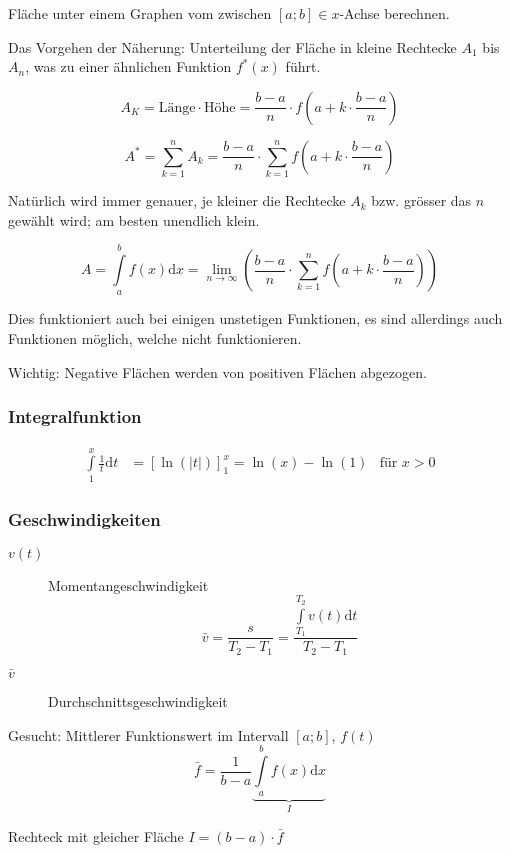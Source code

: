 Fläche unter einem Graphen vom zwischen $[a;b] \in x$-Achse berechnen.

Das Vorgehen der Näherung: Unterteilung der Fläche in kleine Rechtecke $A_1$ bis $A_n$, was zu einer ähnlichen Funktion $f^\ast(x)$ führt.


\[
A_K = \text{Länge} \cdot \text{Höhe} = \frac{b-a}{n} \cdot f\left(a + k \cdot \frac{b-a}{n}\right)
\]

\[
A^\ast = \sum^n_{k=1}{A_k} = \frac{b-a}{n} \cdot \sum^n_{k=1}{ f\left(a + k \cdot \frac{b-a}{n}\right)}
\]

Natürlich wird immer genauer, je kleiner die Rechtecke $A_k$ bzw. grösser das $n$ gewählt wird; am besten unendlich klein.

\[
A = \int\limits^b_a{f(x) \mathrm{d}x} = \lim_{n \to \infty} \left( \frac{b-a}{n} \cdot \sum^n_{k=1}{ f\left(a + k \cdot \frac{b-a}{n}\right)} \right)
\]

Dies funktioniert auch bei einigen unstetigen Funktionen, es sind allerdings auch Funktionen möglich, welche nicht funktionieren.

Wichtig: Negative Flächen werden von positiven Flächen abgezogen.

\subsubsection{Integralfunktion}

\begin{align*}
	\int\limits^{x}_{1} \frac{1}{t} \mathrm{d}t &= \left[ \ln(|t|) \right]^x_1 = \ln(x) - \ln(1) & \text{für } x > 0
\end{align*}

\subsubsection{Geschwindigkeiten}

\begin{description}
	\item[$v(t)$] Momentangeschwindigkeit 
	\[
		\bar{v} = \frac{s}{T_2- T_1} = \frac{\int\limits^{T_2}_{T_1}{v(t)\mathrm{d}t}}{T_2 - T_1}
	\]
	\item[$\bar{v}$] Durchschnittsgeschwindigkeit
\end{description}

Gesucht: Mittlerer Funktionswert im Intervall $[a;b]$, $f(t)$
\[
	\bar{f} = \frac{1}{b-a} \underbrace{\int\limits^b_a{f(x)\mathrm{d}x}}_I
\]

Rechteck mit gleicher Fläche $I = (b-a) \cdot \bar{f}$

